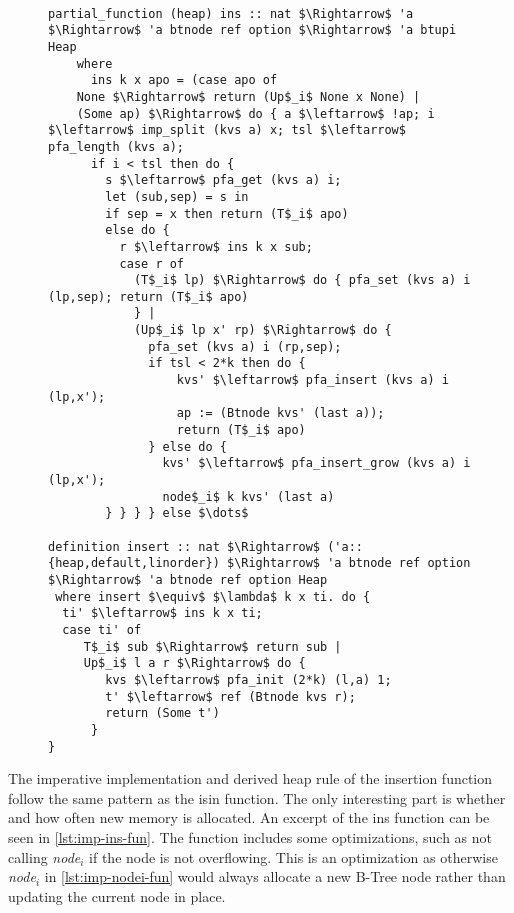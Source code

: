 \begin{figure}
\begin{lstlisting}[mathescape=true, language=Isabelle, label={lst:imp-ins-fun},
    caption={Excerpt of the imperative insert function}]

partial_function (heap) ins :: nat $\Rightarrow$ 'a $\Rightarrow$ 'a btnode ref option $\Rightarrow$ 'a btupi Heap 
    where 
      ins k x apo = (case apo of 
    None $\Rightarrow$ return (Up$_i$ None x None) | 
    (Some ap) $\Rightarrow$ do { a $\leftarrow$ !ap; i $\leftarrow$ imp_split (kvs a) x; tsl $\leftarrow$ pfa_length (kvs a); 
      if i < tsl then do { 
        s $\leftarrow$ pfa_get (kvs a) i; 
        let (sub,sep) = s in 
        if sep = x then return (T$_i$ apo) 
        else do { 
          r $\leftarrow$ ins k x sub; 
          case r of  
            (T$_i$ lp) $\Rightarrow$ do { pfa_set (kvs a) i (lp,sep); return (T$_i$ apo) 
            } | 
            (Up$_i$ lp x' rp) $\Rightarrow$ do { 
              pfa_set (kvs a) i (rp,sep); 
              if tsl < 2*k then do { 
                  kvs' $\leftarrow$ pfa_insert (kvs a) i (lp,x'); 
                  ap := (Btnode kvs' (last a)); 
                  return (T$_i$ apo) 
              } else do { 
                kvs' $\leftarrow$ pfa_insert_grow (kvs a) i (lp,x'); 
                node$_i$ k kvs' (last a) 
        } } } } else $\dots$

definition insert :: nat $\Rightarrow$ ('a::{heap,default,linorder}) $\Rightarrow$ 'a btnode ref option $\Rightarrow$ 'a btnode ref option Heap
 where insert $\equiv$ $\lambda$ k x ti. do {
  ti' $\leftarrow$ ins k x ti;
  case ti' of
     T$_i$ sub $\Rightarrow$ return sub |
     Up$_i$ l a r $\Rightarrow$ do {
        kvs $\leftarrow$ pfa_init (2*k) (l,a) 1;
        t' $\leftarrow$ ref (Btnode kvs r);
        return (Some t')
      }
}

\end{lstlisting}
\end{figure}

The imperative implementation and derived heap rule of the insertion function follow
the same pattern as the isin function.
The only interesting part is whether and how often new memory is allocated.
An excerpt of the ins function can be seen in \autoref{lst:imp-ins-fun}.
The function includes some optimizations, such as not calling
\textit{node$_i$} if the node is not overflowing.
This is an optimization as otherwise \textit{node$_i$} in
\autoref{lst:imp-nodei-fun} would always allocate a new B-Tree node
rather than updating the current node in place.

